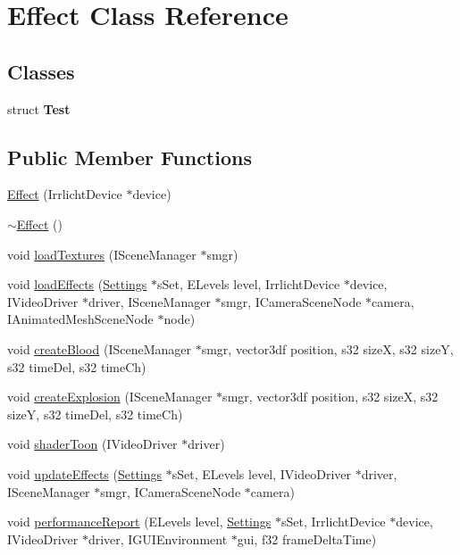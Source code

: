 \hypertarget{class_effect}{
\section{Effect Class Reference}
\label{class_effect}
}
\subsection*{Classes}
\begin{DoxyCompactItemize}
\item 
struct {\bfseries Test}
\end{DoxyCompactItemize}
\subsection*{Public Member Functions}
\begin{DoxyCompactItemize}
\item 
\hyperlink{class_effect_ac86f3543fc587821d73c6c7c2ab1004e}{Effect} (IrrlichtDevice $\ast$device)
\item 
\hyperlink{class_effect_ac26c0a394247e14c9081f875522b5b66}{$\sim$Effect} ()
\item 
void \hyperlink{class_effect_a7145e981ce52d1c0caa8431e6127dd0b}{loadTextures} (ISceneManager $\ast$smgr)
\item 
void \hyperlink{class_effect_a3e8b0debd6152954a2292bc163c801de}{loadEffects} (\hyperlink{struct_settings}{Settings} $\ast$sSet, ELevels level, IrrlichtDevice $\ast$device, IVideoDriver $\ast$driver, ISceneManager $\ast$smgr, ICameraSceneNode $\ast$camera, IAnimatedMeshSceneNode $\ast$node)
\item 
void \hyperlink{class_effect_a7e891cfd00f2b84413f07b27b733cca7}{createBlood} (ISceneManager $\ast$smgr, vector3df position, s32 sizeX, s32 sizeY, s32 timeDel, s32 timeCh)
\item 
void \hyperlink{class_effect_ae7902cfffa5177c32688e57b314dc933}{createExplosion} (ISceneManager $\ast$smgr, vector3df position, s32 sizeX, s32 sizeY, s32 timeDel, s32 timeCh)
\item 
void \hyperlink{class_effect_a6843e6c87adeedd53ab7b16f87583169}{shaderToon} (IVideoDriver $\ast$driver)
\item 
void \hyperlink{class_effect_ae3df4e1067f5ce70ab7faa70314abbc8}{updateEffects} (\hyperlink{struct_settings}{Settings} $\ast$sSet, ELevels level, IVideoDriver $\ast$driver, ISceneManager $\ast$smgr, ICameraSceneNode $\ast$camera)
\item 
void \hyperlink{class_effect_a90a620faa6c94182f28006f40a110ab5}{performanceReport} (ELevels level, \hyperlink{struct_settings}{Settings} $\ast$sSet, IrrlichtDevice $\ast$device, IVideoDriver $\ast$driver, IGUIEnvironment $\ast$gui, f32 frameDeltaTime)

\end{DoxyCompactItemize}
